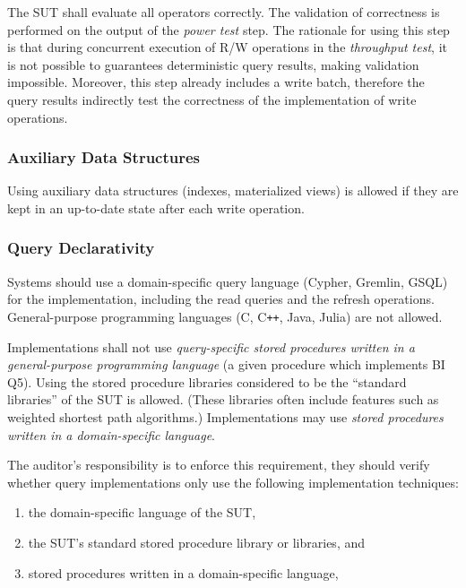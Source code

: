 The SUT shall evaluate all operators correctly.
The validation of correctness is performed on the output of the \emph{power test} step.
The rationale for using this step is that during concurrent execution of R/W operations in the \emph{throughput test}, it is not possible to guarantees deterministic query results, making validation impossible. Moreover, this step already includes a write batch, therefore the query results indirectly test the correctness of the implementation of write operations.

\subsubsection{Auxiliary Data Structures}
\label{sec:bi-auxiliary-data-structures}

Using auxiliary data structures (\eg indexes, materialized views) is allowed if they are kept in an up-to-date state after each write operation.

\subsubsection{Query Declarativity}
\label{sec:bi-query-declarativity}

Systems should use a domain-specific query language (\eg Cypher, Gremlin, GSQL) for the implementation, including the read queries and the refresh operations.
General-purpose programming languages (\eg C, C\texttt{++}, Java, Julia) are not allowed.

Implementations shall not use \emph{query-specific stored procedures written in a general-purpose programming language} (\eg a given procedure which implements BI Q5).
Using the stored procedure libraries considered to be the ``standard libraries'' of the SUT is allowed. (These libraries often include features such as weighted shortest path algorithms.)
Implementations may use \emph{stored procedures written in a domain-specific language}.

The auditor's responsibility is to enforce this requirement, \ie they should verify whether query implementations only use the following implementation techniques:
\begin{enumerate}
    \item the domain-specific language of the SUT,
    \item the SUT's standard stored procedure library or libraries, and
    \item stored procedures written in a domain-specific language,
\end{enumerate}

